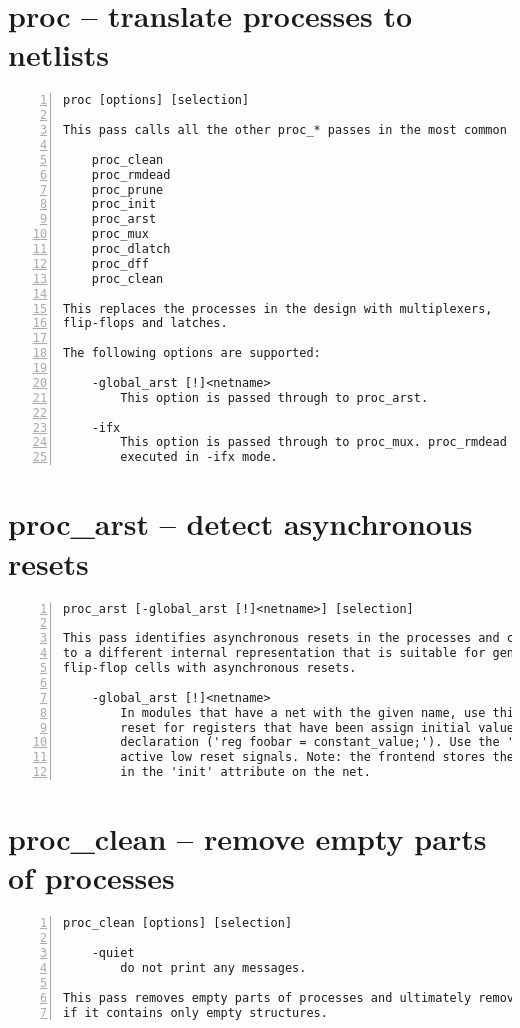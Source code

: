 \section{proc -- translate processes to netlists}
\label{cmd:proc}
\begin{lstlisting}[numbers=left,frame=single]
    proc [options] [selection]

This pass calls all the other proc_* passes in the most common order.

    proc_clean
    proc_rmdead
    proc_prune
    proc_init
    proc_arst
    proc_mux
    proc_dlatch
    proc_dff
    proc_clean

This replaces the processes in the design with multiplexers,
flip-flops and latches.

The following options are supported:

    -global_arst [!]<netname>
        This option is passed through to proc_arst.

    -ifx
        This option is passed through to proc_mux. proc_rmdead is not
        executed in -ifx mode.
\end{lstlisting}

\section{proc\_arst -- detect asynchronous resets}
\label{cmd:proc_arst}
\begin{lstlisting}[numbers=left,frame=single]
    proc_arst [-global_arst [!]<netname>] [selection]

This pass identifies asynchronous resets in the processes and converts them
to a different internal representation that is suitable for generating
flip-flop cells with asynchronous resets.

    -global_arst [!]<netname>
        In modules that have a net with the given name, use this net as async
        reset for registers that have been assign initial values in their
        declaration ('reg foobar = constant_value;'). Use the '!' modifier for
        active low reset signals. Note: the frontend stores the default value
        in the 'init' attribute on the net.
\end{lstlisting}

\section{proc\_clean -- remove empty parts of processes}
\label{cmd:proc_clean}
\begin{lstlisting}[numbers=left,frame=single]
    proc_clean [options] [selection]

    -quiet
        do not print any messages.

This pass removes empty parts of processes and ultimately removes a process
if it contains only empty structures.
\end{lstlisting}

